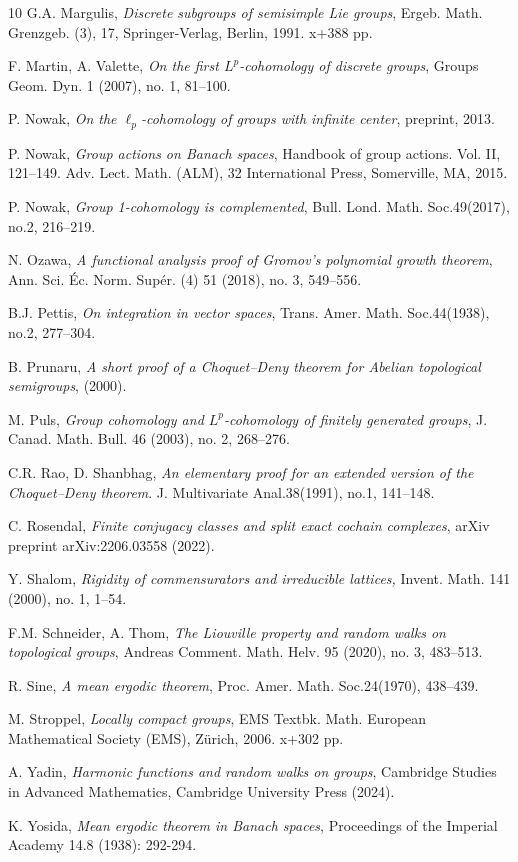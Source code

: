 \documentclass[a4paper,11pt,reqno]{amsart}
\numberwithin{equation}{section}
\theoremstyle{definition}
\theoremstyle{remark}
\theoremstyle{remark}
\begin{document}
\begin{thebibliography}{10}
 G.A. Margulis, \emph{Discrete subgroups of semisimple Lie groups}, Ergeb. Math. Grenzgeb. (3), 17, Springer-Verlag, Berlin, 1991. x+388 pp.

 F. Martin, A. Valette, \emph{On the first $L^{p}$-cohomology of discrete groups}, Groups Geom. Dyn. 1 (2007), no. 1, 81--100.

 P. Nowak, \emph{On the $\ell_{p}$-cohomology of groups with infinite center}, preprint, 2013.

 P. Nowak, \emph{Group actions on Banach spaces}, Handbook of group actions. Vol. II, 121--149. Adv. Lect. Math. (ALM), 32 International Press, Somerville, MA, 2015.

 P. Nowak, \emph{Group 1-cohomology is complemented}, Bull. Lond. Math. Soc.49(2017), no.2, 216--219.

 N. Ozawa, \emph{A functional analysis proof of Gromov's polynomial growth theorem}, Ann. Sci. Éc. Norm. Supér. (4) 51 (2018), no. 3, 549--556.

 B.J. Pettis, \emph{On integration in vector spaces}, Trans. Amer. Math. Soc.44(1938), no.2, 277--304.

 B. Prunaru, \emph{A short proof of a Choquet--Deny theorem for Abelian topological semigroups}, (2000).

 M. Puls, \emph{Group cohomology and $L^{p}$-cohomology of finitely generated groups}, J. Canad. Math. Bull. 46 (2003), no. 2, 268--276.

 C.R. Rao, D. Shanbhag,\emph{ An elementary proof for an extended version of the Choquet--Deny theorem}. J. Multivariate Anal.38(1991), no.1, 141--148.

 C. Rosendal, \emph{Finite conjugacy classes and split exact cochain complexes}, arXiv preprint arXiv:2206.03558 (2022).

 Y. Shalom, \emph{Rigidity of commensurators and irreducible lattices,} Invent. Math. 141 (2000), no. 1, 1--54.

 F.M. Schneider, A. Thom, \emph{The Liouville property and random walks on topological groups}, Andreas Comment. Math. Helv. 95 (2020), no. 3, 483--513.

 R. Sine, \emph{A mean ergodic theorem}, Proc. Amer. Math. Soc.24(1970), 438--439.

 M. Stroppel, \emph{Locally compact groups}, EMS Textbk. Math. European Mathematical Society (EMS), Zürich, 2006. x+302 pp.

 A. Yadin, \emph{Harmonic functions and random walks on groups}, Cambridge Studies in Advanced Mathematics, Cambridge University Press (2024).

 K. Yosida, \emph{Mean ergodic theorem in Banach spaces}, Proceedings of the Imperial Academy 14.8 (1938): 292-294. 
\end{thebibliography}
\end{document}
